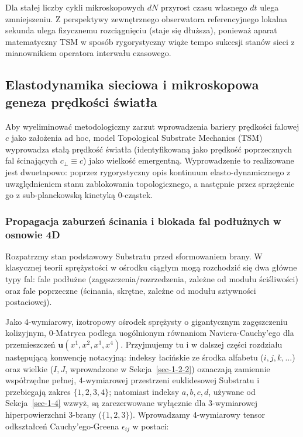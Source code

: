 \documentclass[
  polish,
  letterpaper,
  DIV=11,
  numbers=noendperiod,
  oneside]{scrartcl}
\begin{document}
Dla stałej liczby cykli mikroskopowych \(dN\) przyrost czasu własnego
\(dt\) ulega zmniejszeniu. Z perspektywy zewnętrznego obserwatora
referencyjnego lokalna sekunda ulega fizycznemu rozciągnięciu (staje się
dłuższa), ponieważ aparat matematyczny TSM w sposób rygorystyczny wiąże
tempo sukcesji stanów sieci z mianownikiem operatora interwału
czasowego.

\subsection{Elastodynamika sieciowa i mikroskopowa geneza prędkości
światła}\label{sec-1-3}

Aby wyeliminować metodologiczny zarzut wprowadzenia bariery prędkości
falowej \(c\) jako założenia ad hoc, model Topological Substrate
Mechanics (TSM) wyprowadza stałą prędkość światła (identyfikowaną jako
prędkość poprzecznych fal ścinających \(c_{\perp} \equiv c\)) jako
wielkość emergentną. Wyprowadzenie to realizowane jest dwuetapowo:
poprzez rygorystyczny opis kontinuum elasto-dynamicznego z
uwzględnieniem stanu zablokowania topologicznego, a następnie przez
sprzężenie go z sub-planckowską kinetyką 0-cząstek.

\subsubsection{Propagacja zaburzeń ścinania i blokada fal podłużnych w
osnowie 4D}\label{sec-1-3-1}

Rozpatrzmy stan podstawowy Substratu przed sformowaniem brany. W
klasycznej teorii sprężystości w ośrodku ciągłym mogą rozchodzić się dwa
główne typy fal: fale podłużne (zagęszczenia/rozrzedzenia, zależne od
modułu ściśliwości) oraz fale poprzeczne (ścinania, skrętne, zależne od
modułu sztywności postaciowej).

Jako 4-wymiarowy, izotropowy ośrodek sprężysty o gigantycznym
zagęszczeniu kolizyjnym, 0-Matryca podlega uogólnionym równaniom
Naviera-Cauchy'ego dla przemieszczeń \(\mathbf{u}(x^1, x^2, x^3, x^4)\).
Przyjmujemy tu i w dalszej części rozdziału następującą konwencję
notacyjną: indeksy łacińskie ze środka alfabetu (\(i,j,k,\dots\)) oraz
wielkie (\(I,J\), wprowadzone w Sekcja~\ref{sec-1-2-2}) oznaczają
zamiennie współrzędne pełnej, 4-wymiarowej przestrzeni euklidesowej
Substratu i przebiegają zakres \(\{1,2,3,4\}\); natomiast indeksy
\(a,b,c,d\), używane od Sekcja~\ref{sec-1-4} wzwyż, są zarezerwowane
wyłącznie dla 3-wymiarowej hiperpowierzchni 3-brany (\(\{1,2,3\}\)).
Wprowadzamy 4-wymiarowy tensor odkształceń Cauchy'ego-Greena
\(\epsilon_{ij}\) w postaci:
\end{document}
